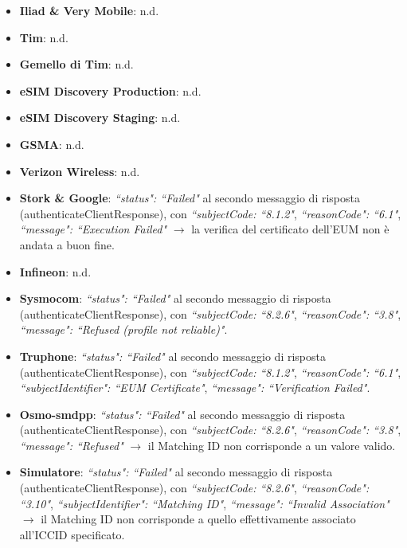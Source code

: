 \documentclass[10pt, oneside]{book}
\begin{document}
\begin{itemize}
\item \textbf{Iliad \& Very Mobile}: n.d.
\item \textbf{Tim}: n.d.
\item \textbf{Gemello di Tim}: n.d.
\item \textbf{eSIM Discovery Production}: n.d.
\item \textbf{eSIM Discovery Staging}: n.d.
\item \textbf{GSMA}: n.d.
\item \textbf{Verizon Wireless}: n.d.
\item \textbf{Stork \& Google}: \textit{``status": ``Failed"} al secondo messaggio di risposta (authenticateClientResponse), con \textit{``subjectCode: ``8.1.2"}, \textit{``reasonCode": ``6.1"}, \textit{``message": ``Execution Failed"} $\rightarrow$ la verifica del certificato dell'EUM non è andata a buon fine.
\item \textbf{Infineon}: n.d.
\item \textbf{Sysmocom}: \textit{``status": ``Failed"} al secondo messaggio di risposta (authenticateClientResponse), con \textit{``subjectCode: ``8.2.6"}, \textit{``reasonCode": ``3.8"}, \textit{``message": ``Refused (profile not reliable)"}.
\item \textbf{Truphone}: \textit{``status": ``Failed"} al secondo messaggio di risposta (authenticateClientResponse), con \textit{``subjectCode: ``8.1.2"}, \textit{``reasonCode": ``6.1"}, \textit{``subjectIdentifier": ``EUM Certificate"}, \textit{``message": ``Verification Failed"}.
\item \textbf{Osmo-smdpp}: \textit{``status": ``Failed"} al secondo messaggio di risposta (authenticateClientResponse), con \textit{``subjectCode: ``8.2.6"}, \textit{``reasonCode": ``3.8"}, \textit{``message": ``Refused"} $\rightarrow$ il Matching ID non corrisponde a un valore valido.
\item \textbf{Simulatore}: \textit{``status": ``Failed"} al secondo messaggio di risposta (authenticateClientResponse), con \textit{``subjectCode: ``8.2.6"}, \textit{``reasonCode": ``3.10"}, \textit{``subjectIdentifier": ``Matching ID"}, \textit{``message": ``Invalid Association"} $\rightarrow$ il Matching ID non corrisponde a quello effettivamente associato all'ICCID specificato.
\end{itemize}
\end{document}
